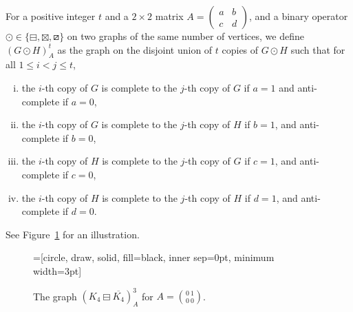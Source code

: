 \documentclass[11pt]{article}
\newcommand\mat{\boxminus}
\newcommand\tri{\boxslash}
\newcommand\antimat{\boxtimes}
\def\S_#1{\overline{K_{#1}}}
\begin{document}
For a positive integer $t$ and 
a $2\times 2$ matrix $A=(\begin{smallmatrix}a&b\\c&d\end{smallmatrix})$,
and a binary operator $\odot \in \{\mat, \antimat, \tri\}$ on two graphs of the same number of vertices,
we define $(G\odot H)^t _A$
as the graph on the disjoint union of $t$ copies of $G\odot H$
such that for all $1\le i<j\le t$,
\begin{enumerate}[(i)]
\item the $i$-th copy of $G$ is complete to
  the $j$-th copy of $G$ if $a=1$
  and anti-complete if $a=0$, 
\item the $i$-th copy of $G$ is complete to
  the $j$-th copy of $H$ if $b=1$,
  and anti-complete if $b=0$, 
\item the $i$-th copy of $H$ is complete to
  the $j$-th copy of $G$ if  $c=1$,
  and anti-complete if $c=0$, 
\item the $i$-th copy of $H$ is complete to
  the $j$-th copy of $H$ if  $d=1$,
  and anti-complete if $d=0$.
\end{enumerate}
See Figure~\ref{fig:construction} for an illustration.
\begin{figure}
  \centering
  =[circle, draw, solid, fill=black, inner sep=0pt, minimum width=3pt]
  \caption{The graph $(K_4\mat \S_4)^3_A$ for $A=
      \binom{0 ~ 1}{0~0}
      $.}
  \label{fig:construction}
\end{figure}
\end{document}
